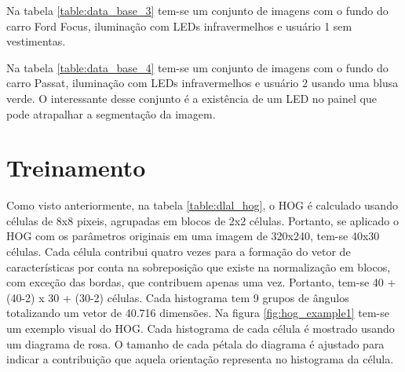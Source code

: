 Na tabela \ref{table:data_base_3} tem-se um conjunto de imagens com o fundo do carro Ford Focus, iluminação com LEDs infravermelhos e usuário 1 sem vestimentas.



Na tabela \ref{table:data_base_4} tem-se um conjunto de imagens com o fundo do carro Passat, iluminação com LEDs infravermelhos e usuário 2 usando uma blusa verde. O interessante desse conjunto é a existência de um LED no painel que pode atrapalhar a segmentação da imagem.


\fi

\section{Treinamento}

Como visto anteriormente, na tabela \ref{table:dlal_hog}, o HOG é calculado usando células de 8x8 pixeis, agrupadas em blocos de 2x2 células. Portanto, se aplicado o HOG com os parâmetros originais em uma imagem de 320x240, tem-se 40x30 células. Cada célula contribui quatro vezes para a formação do vetor de características por conta na sobreposição que existe na normalização em blocos, com exceção das bordas, que contribuem apenas uma vez. Portanto, tem-se 40 + (40-2) x 30 + (30-2) células. Cada histograma tem 9 grupos de ângulos totalizando um vetor de 40.716 dimensões. Na figura \ref{fig:hog_example1} tem-se um exemplo visual do HOG. Cada histograma de cada célula é mostrado usando um diagrama de rosa. O tamanho de cada pétala do diagrama é ajustado para indicar a contribuição que aquela orientação representa no histograma da célula. 

